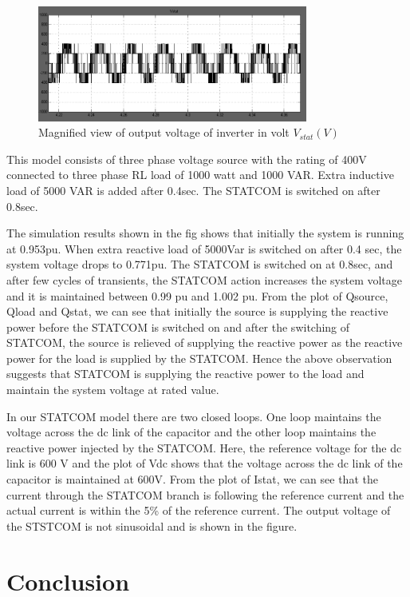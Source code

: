 \documentclass[journal,twoside]{IEEEtran}
\begin{document}
\begin{figure}[!ht]
\includegraphics[width=3.5in]{l}
\caption{Magnified view of output voltage of inverter in volt $V_{stat}(V)$}
\label{fl }
\end{figure}







This model consists of three phase voltage
source with the rating of 400V connected to
three phase RL load of 1000 watt and 1000 VAR.
Extra inductive load of 5000 VAR is added after
0.4sec. The STATCOM is switched on after
0.8sec.

\bigskip
The simulation results shown in the fig shows
that initially the system is running at 0.953pu.
When extra reactive load of 5000Var is switched
on after 0.4 sec, the system voltage drops to
0.771pu. The STATCOM is switched on at 0.8sec,
and after few cycles of transients, the STATCOM
action increases the system voltage and it is
maintained between 0.99 pu and 1.002 pu. From
the plot of Qsource, Qload and Qstat, we can see
that initially the source is supplying the reactive
power before the STATCOM is switched on and
after the switching of STATCOM, the source is relieved of supplying the reactive power as the
reactive power for the load is supplied by the
STATCOM. Hence the above observation
suggests that STATCOM is supplying the reactive
power to the load and maintain the system
voltage at rated value.

\bigskip
In our STATCOM model there are two closed
loops. One loop maintains the voltage across the
dc link of the capacitor and the other loop
maintains the reactive power injected by the
STATCOM. Here, the reference voltage for the dc
link is 600 V and the plot of Vdc shows that the
voltage across the dc link of the capacitor is
maintained at 600V. From the plot of Istat, we
can see that the current through the STATCOM
branch is following the reference current and the
actual current is within the 5\% of the reference
current. The output voltage of the STSTCOM is
not sinusoidal and is shown in the figure.

\section{Conclusion}
\end{document}
